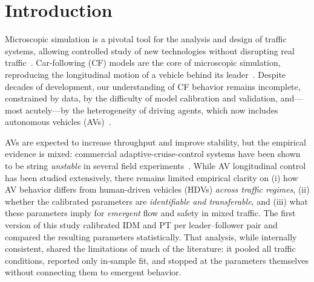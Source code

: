\documentclass[11pt]{article}
\begin{document}
\section{Introduction}
Microscopic simulation is a pivotal tool for the analysis and design of traffic
systems, allowing controlled study of new technologies without disrupting real
traffic~\cite{chung2009}. Car-following (CF) models are the core of microscopic
simulation, reproducing the longitudinal motion of a vehicle behind its
leader~\cite{zheng2023}. Despite decades of development, our understanding of CF
behavior remains incomplete, constrained by data, by the difficulty of model
calibration and validation, and---most acutely---by the heterogeneity of driving
agents, which now includes autonomous vehicles (AVs)~\cite{zheng2016}.

AVs are expected to increase throughput and improve stability, but the empirical
evidence is mixed: commercial adaptive-cruise-control systems have been shown to
be string \emph{unstable} in several field experiments~\cite{gunter2020}. While
AV longitudinal control has been studied extensively, there remains limited
empirical clarity on (i) how AV behavior differs from human-driven vehicles
(HDVs) \emph{across traffic regimes}, (ii) whether the calibrated parameters are
\emph{identifiable and transferable}, and (iii) what these parameters imply for
\emph{emergent} flow and safety in mixed traffic. The first version of this study
calibrated IDM and PT per leader--follower pair and compared the resulting
parameters statistically. That analysis, while internally consistent, shared the
limitations of much of the literature: it pooled all traffic conditions, reported
only in-sample fit, and stopped at the parameters themselves without connecting
them to emergent behavior.
\end{document}
